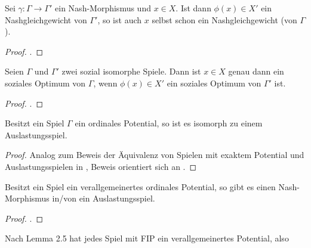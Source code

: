 \begin{lemma}
	Sei $\gamma: \Gamma \to \Gamma'$ ein Nash-Morphismus und $x \in X$. Ist dann $\phi(x) \in X'$ ein Nashgleichgewicht von $\Gamma'$, so ist auch $x$ selbst schon ein Nashgleichgewicht (von $\Gamma$).
\end{lemma}

\begin{proof}
	.
	
\end{proof}

\begin{lemma}
	Seien $\Gamma$ und $\Gamma'$ zwei sozial isomorphe Spiele. Dann ist $x \in X$ genau dann ein soziales Optimum von $\Gamma$, wenn $\phi(x) \in X'$ ein soziales Optimum von $\Gamma'$ ist.
\end{lemma}

\begin{proof}
	.
	
\end{proof}

\begin{satz}
	Besitzt ein Spiel $\Gamma$ ein ordinales Potential, so ist es isomorph zu einem Auslastungsspiel.
\end{satz}

\begin{proof}
	Analog zum Beweis der Äquivalenz von Spielen mit exaktem Potential und Auslastungsspielen in \cite{MonShap}, Beweis orientiert sich an \cite{MultiPotGames}.
\end{proof}

\begin{beob}
	Besitzt ein Spiel ein verallgemeinertes ordinales Potential, so gibt es einen Nash-Morphismus in/von  ein Auslastungsspiel.
\end{beob}

\begin{proof}
	.
\end{proof}

\begin{beob}
	Nach \cite{MonShap} Lemma 2.5 hat jedes Spiel mit FIP ein verallgemeinertes Potential, also 
\end{beob}